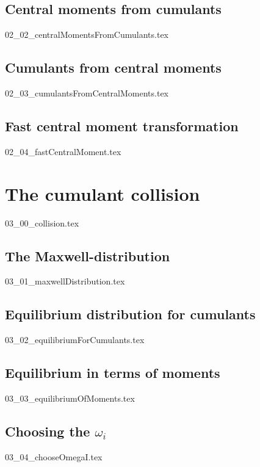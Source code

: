\documentclass[12pt,a4paper,twoside]{article}
\begin{document}
\subsection{Central moments from cumulants}
\label{sub:Central moments from cumulants}
{02_02_centralMomentsFromCumulants.tex}

\subsection{Cumulants from central moments}
\label{sub:Cumulants from central moments}
{02_03_cumulantsFromCentralMoments.tex}

\subsection{Fast central moment transformation}
\label{sub:Fast central moment transformation}
{02_04_fastCentralMoment.tex}

\section{The cumulant collision}
\label{sec:The cumulant collision}
{03_00_collision.tex}

\subsection{The Maxwell-distribution}
\label{sub:The Maxwell-distribution}
{03_01_maxwellDistribution.tex}

\subsection{Equilibrium distribution for cumulants}
\label{sub:Equilibrium distribution for cumulants}
{03_02_equilibriumForCumulants.tex}

\subsection{Equilibrium in terms of moments}
\label{sub:Equilibrium in terms of moments}
{03_03_equilibriumOfMoments.tex}

\subsection{Choosing the \texorpdfstring{$\omega_i$}{omega i}}
\label{sub:Choosing the omega i}
{03_04_chooseOmegaI.tex}
\end{document}
